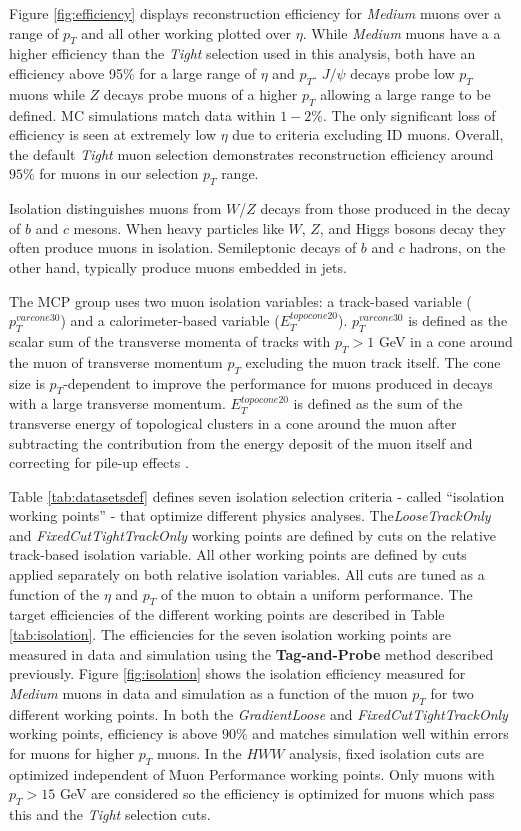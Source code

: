 Figure \ref{fig:efficiency} displays reconstruction efficiency for \textit{Medium} muons over a range of $p_T$ and all other working plotted over $\eta$. While \textit{Medium} muons have a a higher efficiency than the \textit{Tight} selection used in this analysis, both have an efficiency above 95\% for a large range of $\eta$ and $p_T$. $J/\psi$ decays probe low $p_T$ muons while $Z$ decays probe muons of a higher $p_T$ allowing a large range to be defined. MC simulations match data within $1-2\%$. The only significant loss of efficiency is seen at extremely low $\eta$ due to criteria excluding ID muons. Overall, the default \textit{Tight} muon selection demonstrates reconstruction efficiency around $95\%$ for muons in our selection $p_T$ range.

Isolation distinguishes muons from $W$/$Z$ decays from those produced in the decay of $b$ and $c$ mesons. When heavy particles like $W$, $Z$, and Higgs bosons decay they often produce muons in isolation. Semileptonic decays of $b$ and $c$ hadrons, on the other hand, typically produce muons embedded in jets.

The MCP group uses two muon isolation variables: a track-based variable ($p_T^{varcone30}$) and a calorimeter-based variable ($E_T^{topocone20}$). $p_T^{varcone30}$ is defined as the scalar sum of the transverse momenta of tracks with $p_T > 1$ GeV in a cone around the muon of transverse momentum $p_T$ excluding the muon track itself. The cone size is $p_T$-dependent to improve the performance for muons produced in decays with a large transverse momentum. $E_T^{topocone20}$ is defined as the sum of the transverse energy of topological clusters in a cone around the muon after subtracting the contribution from the energy deposit of the muon itself and correcting for pile-up effects \cite{jets}. 

Table \ref{tab:datasetsdef} defines seven isolation selection criteria - called ``isolation working points'' - that optimize different physics analyses. The\textit{LooseTrackOnly} and \textit{FixedCutTightTrackOnly} working points are defined by cuts on the relative track-based isolation variable. All other working points are defined by cuts applied separately on both relative isolation variables. All cuts are tuned as a function of the $\eta$ and $p_T$ of the muon to obtain a uniform performance. The target efficiencies of the different working points are described in Table \ref{tab:isolation}. The efficiencies for the seven isolation working points are measured in data and simulation using the \textbf{Tag-and-Probe} method described previously. Figure \ref{fig:isolation} shows the isolation efficiency measured for \textit{Medium} muons in data and simulation as a function of the muon $p_T$ for two different working points. In both the \textit{GradientLoose} and \textit{FixedCutTightTrackOnly} working points, efficiency is above $90\%$ and matches simulation well within errors for muons for higher $p_T$ muons. In the $HWW$ analysis, fixed isolation cuts are optimized independent of Muon Performance working points. Only muons with $p_T>15$ GeV are considered so the efficiency is optimized for muons which pass this and the \textit{Tight} selection cuts.  

